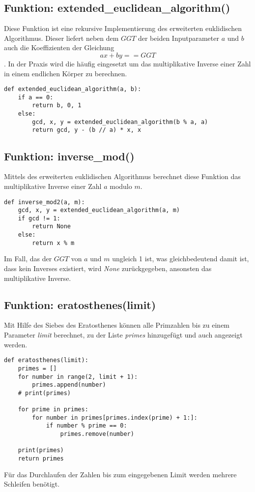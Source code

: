 \subsection{Funktion: extended\_euclidean\_algorithm()}
Diese Funktion ist eine rekursive Implementierung des erweiterten euklidischen Algorithmus. Dieser liefert neben dem $GGT$ der beiden Inputparameter $a$ und $b$ auch die Koeffizienten der Gleichung $$ax + by == GGT$$. In der Praxis wird die häufig eingesetzt um das multiplikative Inverse einer Zahl in einem endlichen Körper zu berechnen.
\vspace{\baselineskip}
\begin{lstlisting}[caption={Funktion: extended\_euclidean\_algorithm()}, captionpos=b]
def extended_euclidean_algorithm(a, b):
    if a == 0:
        return b, 0, 1
    else:
        gcd, x, y = extended_euclidean_algorithm(b % a, a)
        return gcd, y - (b // a) * x, x
\end{lstlisting}
\vspace{\baselineskip}

\subsection{Funktion: inverse\_mod()}
Mittels des erweiterten euklidischen Algorithmus berechnet diese Funktion das multiplikative Inverse einer Zahl $a$ modulo $m$.

\vspace{\baselineskip}
\begin{lstlisting}[caption={Funktion: inverse\_mod()}, captionpos=b]
def inverse_mod2(a, m):
    gcd, x, y = extended_euclidean_algorithm(a, m)
    if gcd != 1:
        return None
    else:
        return x % m
\end{lstlisting}
\vspace{\baselineskip}

Im Fall, das der $GGT$ von $a$ und $m$ ungleich 1 ist, was gleichbedeutend damit ist, dass kein Inverses existiert, wird \textit{None} zurückgegeben, ansonsten das  multiplikative Inverse.


\subsection{Funktion: eratosthenes(limit)}
Mit Hilfe des Siebes des Eratosthenes können alle Primzahlen bis zu einem Parameter \textit{limit} berechnet, zu der Liste \textit{primes} hinzugefügt und auch angezeigt werden.

\vspace{\baselineskip}
\begin{lstlisting}[caption={Funktion: eratosthenes(limit)}, captionpos=b]
def eratosthenes(limit):
    primes = []
    for number in range(2, limit + 1):
        primes.append(number)
    # print(primes)

    for prime in primes:
        for number in primes[primes.index(prime) + 1:]:
            if number % prime == 0:
                primes.remove(number)

    print(primes)
    return primes
\end{lstlisting}
\vspace{\baselineskip}

Für das Durchlaufen der Zahlen bis zum eingegebenen Limit werden mehrere Schleifen benötigt. 
